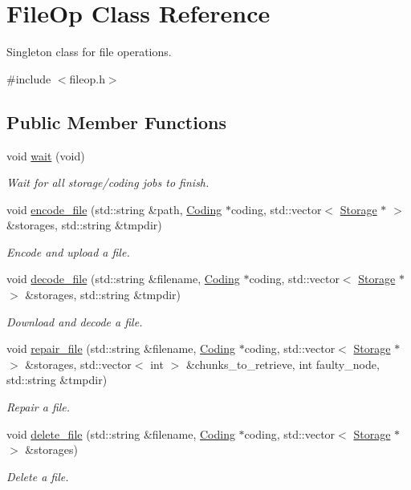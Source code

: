 \hypertarget{classFileOp}{\section{\-File\-Op \-Class \-Reference}
\label{classFileOp}
}


\-Singleton class for file operations.  




{\ttfamily \#include $<$fileop.\-h$>$}

\subsection*{\-Public \-Member \-Functions}
\begin{DoxyCompactItemize}
\item 
void \hyperlink{classFileOp_aec4f4964e1c0af0942e1e924849a94aa}{wait} (void)
\begin{DoxyCompactList}\small\item\em \-Wait for all storage/coding jobs to finish. \end{DoxyCompactList}\item 
void \hyperlink{classFileOp_a448496e69f72e5e204701ffc56e61f35}{encode\-\_\-file} (std\-::string \&path, \hyperlink{classCoding}{\-Coding} $\ast$coding, std\-::vector$<$ \hyperlink{classStorage}{\-Storage} $\ast$ $>$ \&storages, std\-::string \&tmpdir)
\begin{DoxyCompactList}\small\item\em \-Encode and upload a file. \end{DoxyCompactList}\item 
void \hyperlink{classFileOp_af452788b77c92ffea73a157c13e8232d}{decode\-\_\-file} (std\-::string \&filename, \hyperlink{classCoding}{\-Coding} $\ast$coding, std\-::vector$<$ \hyperlink{classStorage}{\-Storage} $\ast$ $>$ \&storages, std\-::string \&tmpdir)
\begin{DoxyCompactList}\small\item\em \-Download and decode a file. \end{DoxyCompactList}\item 
void \hyperlink{classFileOp_aabcce0c013e18538f5c978774ad81af5}{repair\-\_\-file} (std\-::string \&filename, \hyperlink{classCoding}{\-Coding} $\ast$coding, std\-::vector$<$ \hyperlink{classStorage}{\-Storage} $\ast$ $>$ \&storages, std\-::vector$<$ int $>$ \&chunks\-\_\-to\-\_\-retrieve, int faulty\-\_\-node, std\-::string \&tmpdir)
\begin{DoxyCompactList}\small\item\em \-Repair a file. \end{DoxyCompactList}\item 
void \hyperlink{classFileOp_ab26b8a55c4d193a377627f1c42e8bd11}{delete\-\_\-file} (std\-::string \&filename, \hyperlink{classCoding}{\-Coding} $\ast$coding, std\-::vector$<$ \hyperlink{classStorage}{\-Storage} $\ast$ $>$ \&storages)
\begin{DoxyCompactList}\small\item\em \-Delete a file. \end{DoxyCompactList}\end{DoxyCompactItemize}
